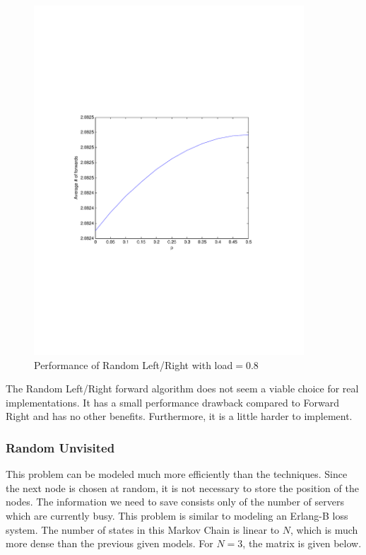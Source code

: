 \documentclass[10pt,a4paper]{article}
\begin{document}
\begin{figure}[h!tb]
\centering
\includegraphics[clip=true, trim=9em 24em 9em 24em, width=0.9\textwidth]{resources/plotrandlrp.pdf}
\caption{Performance of Random Left/Right with load$=0.8$}
\label{validrlrp}
\end{figure}

The Random Left/Right forward algorithm does not seem a viable choice for real implementations. It has a small performance drawback compared to Forward Right and has no other benefits. Furthermore, it is a little harder to implement.

\subsubsection*{Random Unvisited}
This problem can be modeled much more efficiently than the techniques. Since the next node is chosen at random, it is not necessary to store the position of the nodes. The information we need to save consists only of the number of servers which are currently busy. This problem is similar to modeling an Erlang-B loss system. The number of states in this Markov Chain is linear to $N$, which is much more dense than the previous given models. For $N=3$, the matrix is given below.
\end{document}
